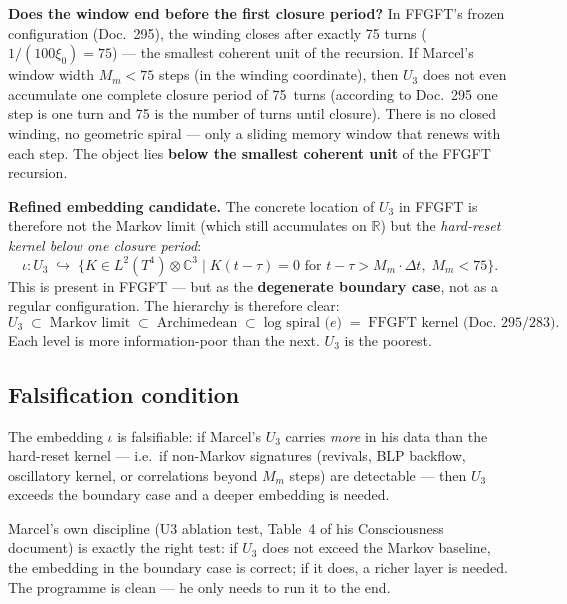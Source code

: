 \textbf{Does the window end before the first closure period?} In FFGFT's frozen
configuration (Doc.~295), the winding closes after exactly 75 turns
($1/(100\xi_0) = 75$) --- the smallest coherent unit of the recursion.
If Marcel's window width $M_m < 75$ steps (in the winding coordinate),
then $U_3$ does not even accumulate one complete closure period of 75~turns (according to Doc.~295 one step is one turn and 75 is the number of turns
until closure). There is no closed
winding, no geometric spiral --- only a sliding memory window that renews
with each step. The object lies \textbf{below the smallest coherent unit}
of the FFGFT recursion.

\textbf{Refined embedding candidate.} The concrete location of $U_3$ in
FFGFT is therefore not the Markov limit (which still accumulates on
$\mathbb{R}$) but the \emph{hard-reset kernel below one closure period}:
\begin{equation}
  \iota\colon U_3 \;\hookrightarrow\;
  \bigl\{K \in L^2(T^4)\otimes\mathbb{C}^3 \;\big|\;
  K(t-\tau) = 0 \text{ for } t-\tau > M_m\cdot\Delta t,\;
  M_m < 75\bigr\}.
\end{equation}
This is present in FFGFT --- but as the \textbf{degenerate boundary case},
not as a regular configuration. The hierarchy is therefore clear:
\begin{equation}
  U_3 \;\subset\; \text{Markov limit} \;\subset\;
  \text{Archimedean} \;\subset\; \text{log spiral (}e\text{)}
  \;=\; \text{FFGFT kernel (Doc.~295/283)}.
\end{equation}
Each level is more information-poor than the next. $U_3$ is the poorest.

\subsection*{Falsification condition}

The embedding $\iota$ is falsifiable: if Marcel's $U_3$ carries
\emph{more} in his data than the hard-reset kernel --- i.e.\ if non-Markov
signatures (revivals, BLP backflow, oscillatory kernel, or correlations
beyond $M_m$ steps) are detectable --- then $U_3$ exceeds the boundary
case and a deeper embedding is needed.

Marcel's own discipline (U3 ablation test, Table~4 of his Consciousness
document) is exactly the right test: if $U_3$ does not exceed the Markov
baseline, the embedding in the boundary case is correct; if it does, a
richer layer is needed. The programme is clean --- he only needs to run it
to the end.

